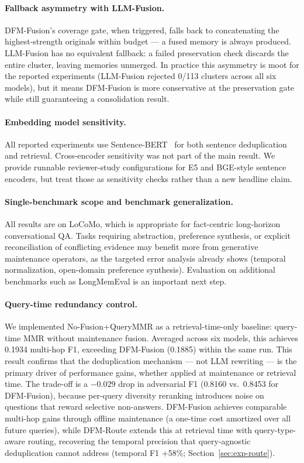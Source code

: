 \paragraph{Fallback asymmetry with LLM-Fusion.}
DFM-Fusion's coverage gate, when triggered, falls back to concatenating the highest-strength originals within budget — a fused memory is always produced. LLM-Fusion has no equivalent fallback: a failed preservation check discards the entire cluster, leaving memories unmerged. In practice this asymmetry is moot for the reported experiments (LLM-Fusion rejected 0/113 clusters across all six models), but it means DFM-Fusion is more conservative at the preservation gate while still guaranteeing a consolidation result.

\paragraph{Embedding model sensitivity.}
All reported experiments use Sentence-BERT~\citep{Reimers2019SentenceBERTSE} for both sentence deduplication and retrieval. Cross-encoder sensitivity was not part of the main result. We provide runnable reviewer-study configurations for E5 and BGE-style sentence encoders, but treat those as sensitivity checks rather than a new headline claim.

\paragraph{Single-benchmark scope and benchmark generalization.}
All results are on LoCoMo, which is appropriate for fact-centric long-horizon conversational QA. Tasks requiring abstraction, preference synthesis, or explicit reconciliation of conflicting evidence may benefit more from generative maintenance operators, as the targeted error analysis already shows (temporal normalization, open-domain preference synthesis). Evaluation on additional benchmarks such as LongMemEval is an important next step.

\paragraph{Query-time redundancy control.}
We implemented No-Fusion+QueryMMR as a retrieval-time-only baseline: query-time MMR without maintenance fusion.
Averaged across six models, this achieves 0.1934 multi-hop F1, exceeding DFM-Fusion (0.1885) within the same run.
This result confirms that the deduplication mechanism --- not LLM rewriting --- is the primary driver of performance gains, whether applied at maintenance or retrieval time.
The trade-off is a $-0.029$ drop in adversarial F1 (0.8160 vs.\ 0.8453 for DFM-Fusion), because per-query diversity reranking introduces noise on questions that reward selective non-answers.
DFM-Fusion achieves comparable multi-hop gains through offline maintenance (a one-time cost amortized over all future queries), while DFM-Route extends this at retrieval time with query-type-aware routing, recovering the temporal precision that query-agnostic deduplication cannot address (temporal F1 +58\%; Section~\ref{sec:exp-route}).

